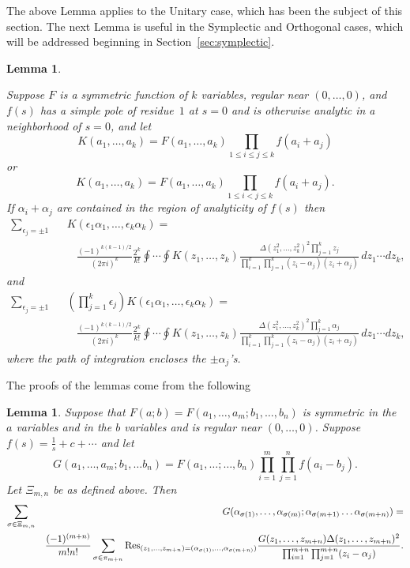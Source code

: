 \documentclass[12pt,letterpaper]{amsart}
\theoremstyle{plain}
\newtheorem{lemma}[theorem]{Lemma}
\theoremstyle{definition}
\theoremstyle{remark}
\numberwithin{equation}{subsection}
\numberwithin{theorem}{subsection}
\numberwithin{table}{subsection}
\begin{document}
The above Lemma applies to the Unitary case, which has been
the subject of this section.  The next Lemma
is useful in the Symplectic and Orthogonal cases,
which will be addressed beginning in Section~\ref{sec:symplectic}.


\begin{lemma} \label{thm:concisesumsymplectic}

 Suppose $F$ is a symmetric function of $k$
variables, regular near $(0,\ldots,0)$, and $f(s)$ has a simple
pole of residue~$1$ at $s=0$ and is otherwise analytic in a
neighborhood of $s=0$, and let
\begin{equation}
K(a_1,\ldots,a_k)=F(a_1,\ldots,a_k) \prod_{1\leq i \leq j\leq k}
f(a_i+a_j)
\end{equation}
or
\begin{equation}
K(a_1,\ldots,a_k)=F(a_1,\ldots,a_k) \prod_{1\leq i < j\leq k}
f(a_i+a_j).
\end{equation}
If $\alpha_i+\alpha_j$ are contained in the
region of analyticity of $f(s)$ then
\begin{eqnarray}
\sum_{\epsilon_j =\pm 1 }&   &K(\epsilon_1 \alpha_1,\ldots,
\epsilon_k\alpha_k) =\nonumber \\&   &\ \ \ \ \frac{(-1)^{k(k-1)/2} } {(2\pi
i)^k} \frac{2^k}{k!} \oint \cdots \oint K(z_1,\ldots,z_k)
\frac{\Delta(z_1^2,\ldots,z_k^2)^2 \prod_{j=1}^k z_j }
{\prod_{i=1}^k\prod_{j=1}^k (z_i-\alpha_j)(z_i+\alpha_j)}
\,dz_1\cdots dz_k , \end{eqnarray} and
\begin{eqnarray}
\sum_{\epsilon_j=\pm 1  }&   &(\prod_{j=1}^k
\epsilon_j)K(\epsilon_1 \alpha_1,\ldots, \epsilon_k\alpha_k) = \nonumber \\&   &\ \ \ \ \frac{(-1)^{k(k-1)/2} } {(2\pi i)^k} \frac{2^k}{k!} \oint
\cdots \oint K(z_1,\ldots,z_k) \frac{\Delta(z_1^2,\ldots,z_k^2)^2
\prod_{j=1}^k \alpha_j } {\prod_{i=1}^k\prod_{j=1}^k
(z_i-\alpha_j)(z_i+\alpha_j)} \,dz_1\cdots dz_k, \end{eqnarray}
where the path of integration encloses the $\pm \alpha_j$'s.
\end{lemma}

The proofs of the lemmas come from the following

\begin{lemma}Suppose that $F(a;b)=F(a_1,\dots,a_m;b_1,\dots,b_{n})$
is symmetric  in the $a$ variables and in the  $b$ variables and is
regular near $(0,\dots,0)$. Suppose  $f(s)=\frac 1 s +c +\cdots$
and let
$$
G(a_1,\dots,a_m;b_1,\dots b_n)= F(a_1,\dots;\dots,b_n)
\prod_{i=1}^m\prod_{j=1}^n f(a_i-b_j).
$$
 Let $\Xi_{m,n}$ be as defined above.  Then 
\begin{eqnarray*}
 \sum_{\sigma \in \Xi_{m,n}}&&
G( \alpha_{\sigma(1)},\dots,  \alpha_{\sigma(m)};
    \alpha_{\sigma(m+1)}\dots  \alpha_{\sigma(m+n)})=\\
&&
 \frac{(-1)^{(m+n)}}{m!n!}\sum_{\sigma\in \pi_{m+n}}
\mbox{\rm Res}_{(z_1,\dots,z_{m+n})=
 (\alpha_{\sigma(1)},\dots,\alpha_{\sigma(m+n)})}
\frac{G(z_1,\dots,z_{m+n})
\Delta(z_1,\dots,z_{m+n})^2}{\prod_{i=1}^{m+n}\prod_{j=1}^{m+n}
(z_i-\alpha_j)}  .
\end{eqnarray*}
\end{lemma}
\end{document}
